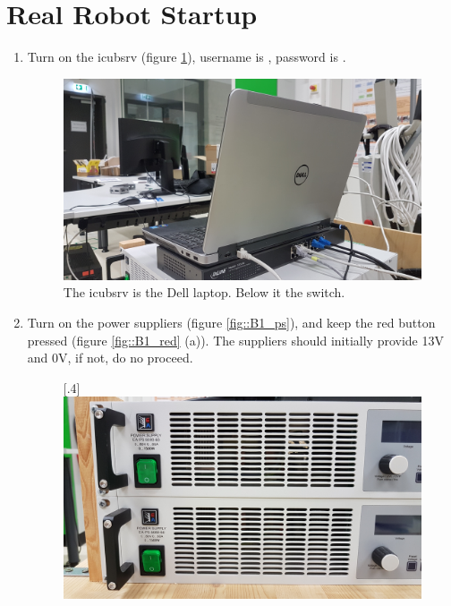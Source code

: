 \section{Real Robot Startup}
\label{sec::B1_rr}
\begin{enumerate}
	\item Turn on the icubsrv (figure \ref{fig::B1_icubsrv}), username is , password is .
	\begin{figure}[h!]
		\centering
		\includegraphics[scale=.04]{chapters/06_appendix/img/icubsrv.jpg}
		\caption{The icubsrv is the Dell laptop. Below it the switch.}
		\label{fig::B1_icubsrv}
	\end{figure}
	\item Turn on the power suppliers (figure \ref{fig::B1_ps}), and keep the red button pressed (figure \ref{fig::B1_red} (a)). The suppliers should initially provide 13V and 0V, if not, do no proceed.
	\begin{figure}[h!]
		\centering
		[.4\linewidth]{\includegraphics[scale=.04]{chapters/06_appendix/img/power_supply.jpg}}

\end{figure}
\end{enumerate}
